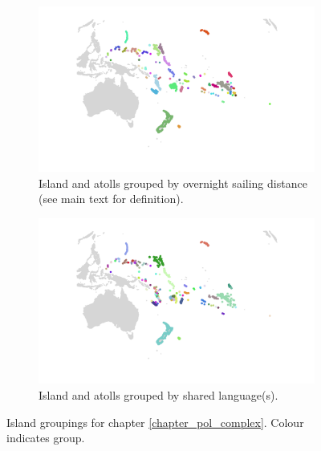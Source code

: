 \documentclass[a4paper,10pt]{article} %
\begin{document}

\begin{figure}[H]
\centering
    \begin{subfigure}{\textwidth}
    \includegraphics[width=\textwidth]{illustrations/plots_from_R/polygon_marck_group_map.png}
     \caption{Island and atolls grouped by overnight sailing distance (see main text for definition).}
\label{marck_group_map}
    \end{subfigure}

    \begin{subfigure}{\textwidth}
\includegraphics[width=\textwidth]{illustrations/plots_from_R/polygon_medium_group_map.png}
\caption{Island and atolls grouped by shared language(s).}
\label{medium_group_map}
    \end{subfigure}
\caption{{Island groupings for chapter \ref{chapter_pol_complex}. Colour indicates group.}}
    \label{fig:island_groups}
    \end{figure}
    
\end{document}

